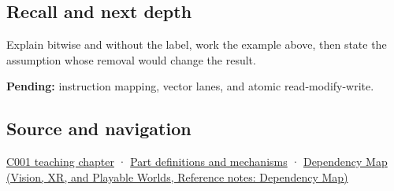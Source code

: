 \subsection{Recall and next depth}\label{appendix-68b52453737c-recall-and-next-depth}

Explain bitwise and without the label, work the example above, then state the assumption whose removal would change the result.

\textbf{Pending:} instruction mapping, vector lanes, and atomic read-modify-write.

\subsection{Source and navigation}\label{appendix-68b52453737c-source-and-navigation}

\hyperref[01-foundations-i-ch001-from-a-signal-to-an-interpretation]{C001 teaching chapter} · \hyperref[appendix-fd090d982a15]{Part definitions and mechanisms} · \href{../07-Vision-XR-and-Playable-Worlds/main.pdf\#nameddest=appendix-4ad47bdd269a}{Dependency Map (Vision, XR, and Playable Worlds, Reference notes: Dependency Map)}
